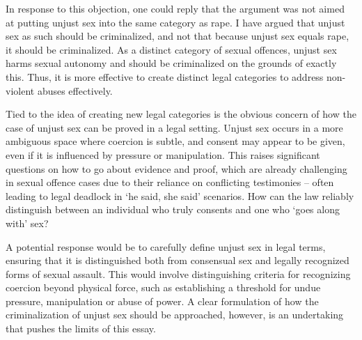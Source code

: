 In response to this objection, one could reply that the argument was not
aimed at putting unjust sex into the same category as rape. I have
argued that unjust sex as such should be criminalized, and not that
because unjust sex equals rape, it should be criminalized. As a distinct
category of sexual offences, unjust sex harms sexual autonomy and should
be criminalized on the grounds of exactly this. Thus, it is more
effective to create distinct legal categories to address non-violent
abuses effectively.

Tied to the idea of creating new legal categories is the obvious concern
of how the case of unjust sex can be proved in a legal setting. Unjust
sex occurs in a more ambiguous space where coercion is subtle, and
consent may appear to be given, even if it is influenced by pressure or
manipulation. This raises significant questions on how to go about
evidence and proof, which are already challenging in sexual offence
cases due to their reliance on conflicting testimonies -- often leading
to legal deadlock in `he said, she said' scenarios. How can the law
reliably distinguish between an individual who truly consents and one
who `goes along with' sex?

A potential response would be to carefully define unjust sex in legal
terms, ensuring that it is distinguished both from consensual sex and
legally recognized forms of sexual assault. This would involve
distinguishing criteria for recognizing coercion beyond physical force,
such as establishing a threshold for undue pressure, manipulation or
abuse of power. A clear formulation of how the criminalization of unjust
sex should be approached, however, is an undertaking that pushes the
limits of this essay.


